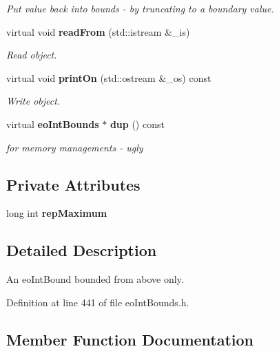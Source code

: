 \begin{CompactItemize}
\begin{CompactList}\small\item\em Put value back into bounds - by truncating to a boundary value. \item\end{CompactList}\item 
virtual void {\bf read\-From} (std::istream \&\_\-is)
\begin{CompactList}\small\item\em Read object. \item\end{CompactList}\item 
virtual void {\bf print\-On} (std::ostream \&\_\-os) const 
\begin{CompactList}\small\item\em Write object. \item\end{CompactList}\item 
virtual {\bf eo\-Int\-Bounds} $\ast$ {\bf dup} () const \label{classeo_int_above_bound_a16}

\begin{CompactList}\small\item\em for memory managements - ugly \item\end{CompactList}\end{CompactItemize}
\subsection*{Private Attributes}
\begin{CompactItemize}
\item 
long int {\bf rep\-Maximum}\label{classeo_int_above_bound_r0}

\end{CompactItemize}


\subsection{Detailed Description}
An eo\-Int\-Bound bounded from above only. 



Definition at line 441 of file eo\-Int\-Bounds.h.

\subsection{Member Function Documentation}
